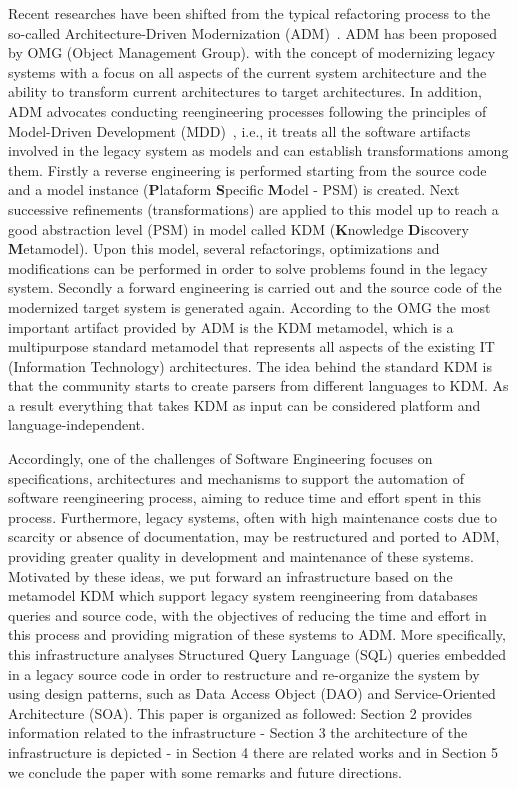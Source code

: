 Recent researches have been shifted from the typical refactoring process to the so-called Architecture-Driven Modernization (ADM)~\cite{Ulrich:2010}. ADM has been proposed by OMG (Object Management Group). with the concept of modernizing legacy systems with a focus on all aspects of the current system architecture and the ability to transform current architectures to target architectures. In addition, ADM advocates conducting reengineering processes following the principles of Model-Driven Development (MDD)~\cite{Ulrich:2010:IST:1841736}, i.e., it treats all the software artifacts involved in the legacy system as models and can establish transformations among them.  Firstly a reverse engineering is performed starting from the source code and a model instance (\textbf{P}lataform \textbf{S}pecific \textbf{M}odel - PSM) is created. Next successive refinements (transformations) are applied to this model up to reach a good abstraction level (PSM) in model called KDM (\textbf{K}nowledge \textbf{D}iscovery \textbf{M}etamodel). Upon this model, several refactorings, optimizations and modifications can be performed in order to solve problems found in the legacy system. Secondly a forward engineering is carried out and the source code of the modernized target system is generated again. According to the OMG the most important artifact provided by ADM is the KDM metamodel, which is a multipurpose standard metamodel that represents all aspects of the existing IT (Information  Technology) architectures. The idea behind the standard KDM is that the community starts to create parsers from different languages to KDM. As a result everything that takes KDM as input can be considered platform and language-independent.

Accordingly, one of the challenges of Software Engineering focuses on specifications, architectures and mechanisms to support the automation of software reengineering process, aiming to reduce time and effort spent in this process. Furthermore, legacy systems, often with high maintenance costs due to scarcity or absence of documentation, may be restructured and ported to ADM, providing greater quality in development and maintenance of these systems. Motivated by these ideas, we put forward an infrastructure based on the metamodel KDM which support legacy system reengineering from databases queries and source code, with the objectives of reducing the time and effort in this process and providing migration of these systems to ADM. More specifically, this infrastructure analyses Structured Query Language (SQL) queries embedded in a legacy source code in order to restructure and re-organize the system by using design patterns, such as Data Access Object (DAO) and Service-Oriented Architecture (SOA).  This paper is organized as followed: Section 2 provides information related to the infrastructure - Section 3 the architecture of the infrastructure is depicted - in Section 4 there are related works and in Section 5 we conclude the paper with some remarks and future directions.


